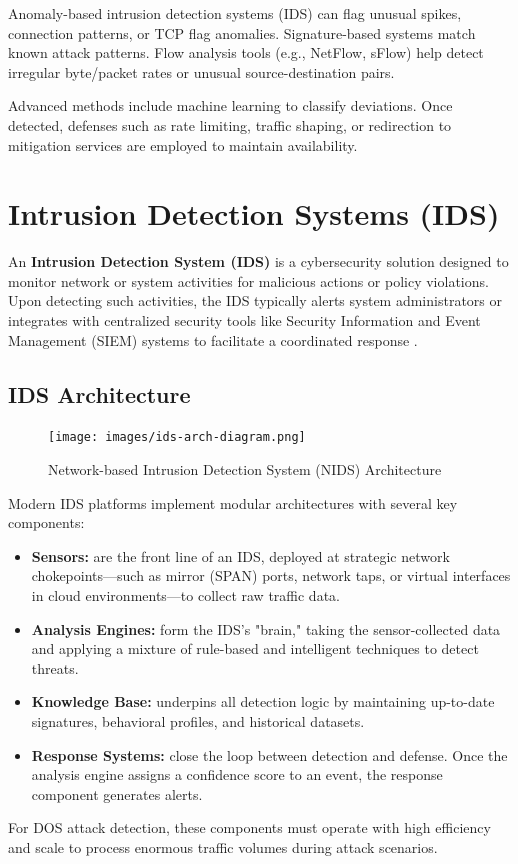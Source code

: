 \documentclass[16pt]{report}
\begin{document}
Anomaly-based intrusion detection systems (IDS) can flag unusual spikes, connection patterns, or TCP flag anomalies. Signature-based systems match known attack patterns. Flow analysis tools (e.g., NetFlow, sFlow) help detect irregular byte/packet rates or unusual source-destination pairs.

Advanced methods include machine learning to classify deviations. Once detected, defenses such as rate limiting, traffic shaping, or redirection to mitigation services are employed to maintain availability.

\section{Intrusion Detection Systems (IDS)}
An \textbf{Intrusion Detection System (IDS)} is a cybersecurity solution designed to monitor network or system activities for malicious actions or policy violations. Upon detecting such activities, the IDS typically alerts system administrators or integrates with centralized security tools like Security Information and Event Management (SIEM) systems to facilitate a coordinated response \cite{ibm_ids}.

\subsection{IDS Architecture}
\begin{figure}[H]
    \centering
    \texttt{[image: images/ids-arch-diagram.png]}
    \caption{Network-based Intrusion Detection System (NIDS) Architecture}
    \label{fig:nids-architecture}
\end{figure}

Modern IDS platforms implement modular architectures with several key components:
\begin{itemize}
    \item \textbf{Sensors:} are the front line of an IDS, deployed at strategic network chokepoints—such as mirror (SPAN) ports, network taps, or virtual interfaces in cloud environments—to collect raw traffic data.
    \item \textbf{Analysis Engines:} form the IDS's "brain," taking the sensor-collected data and applying a mixture of rule-based and intelligent techniques to detect threats.
    \item \textbf{Knowledge Base:} underpins all detection logic by maintaining up-to-date signatures, behavioral profiles, and historical datasets.
    \item \textbf{Response Systems:} close the loop between detection and defense. Once the analysis engine assigns a confidence score to an event, the response component generates alerts.
\end{itemize}
For DOS attack detection, these components must operate with high efficiency and scale to process enormous traffic volumes during attack scenarios.
\end{document}
